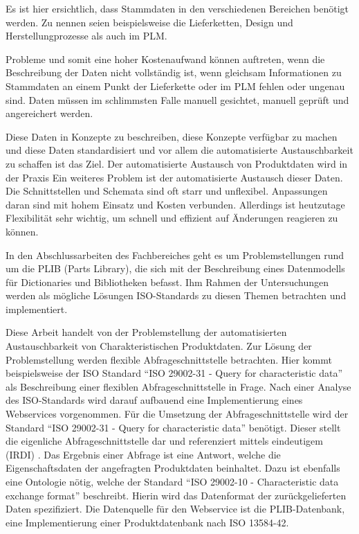 Es ist hier ersichtlich, dass Stammdaten in den verschiedenen Bereichen benötigt werden. Zu nennen seien beispielsweise die Lieferketten, Design und Herstellungprozesse als auch im \gls{PLM}.     

Probleme und somit eine hoher Kostenaufwand können auftreten, wenn die Beschreibung der Daten nicht vollständig ist, wenn gleichsam Informationen zu Stammdaten an einem Punkt der Lieferkette oder im \gls{PLM} fehlen oder ungenau sind. Daten müssen im schlimmsten Falle manuell gesichtet, manuell geprüft und angereichert werden.  

Diese Daten in Konzepte zu beschreiben, diese Konzepte verfügbar zu machen und diese Daten standardisiert und vor allem die automatisierte Austauschbarkeit zu schaffen ist das Ziel. Der automatisierte Austausch von Produktdaten wird in der Praxis Ein weiteres Problem ist der automatisierte Austausch dieser Daten. Die Schnittstellen und Schemata sind oft starr und unflexibel. Anpassungen daran sind mit hohem Einsatz und Kosten verbunden. Allerdings ist heutzutage Flexibilität sehr wichtig, um schnell und effizient auf Änderungen reagieren zu können. 

In den Abschlussarbeiten des Fachbereiches geht es um Problemstellungen rund um die \gls{PLIB} (Parts Library), die sich mit der Beschreibung eines Datenmodells für Dictionaries und Bibliotheken befasst. Ihm Rahmen der Untersuchungen werden als mögliche Lösungen ISO-Standards zu diesen Themen betrachten und implementiert. 

Diese Arbeit handelt von der Problemstellung der automatisierten Austauschbarkeit von Charakteristischen Produktdaten. Zur Lösung der Problemstellung werden flexible \gls{Abfrageschnittstelle} betrachten. Hier kommt beispielsweise der ISO Standard \enquote{ISO 29002-31 - Query for characteristic data} als Beschreibung einer flexiblen \gls{Abfrageschnittstelle} in Frage. Nach einer Analyse des ISO-Standards wird darauf aufbauend eine Implementierung eines \glspl{Webservice} vorgenommen. 
Für die Umsetzung der \gls{Abfrageschnittstelle} wird der Standard \enquote{ISO 29002-31 - Query for characteristic data} benötigt. Dieser stellt die eigenliche \gls{Abfrageschnittstelle} dar und referenziert mittels eindeutigem  (IRDI) . Das Ergebnis einer Abfrage ist eine Antwort, welche die Eigenschaftsdaten der angefragten Produktdaten beinhaltet. Dazu ist ebenfalls eine Ontologie nötig, welche der Standard \enquote{ISO 29002-10 - Characteristic data exchange format} beschreibt. Hierin wird das Datenformat der zurückgelieferten Daten spezifiziert. Die Datenquelle für den Webservice ist die PLIB-Datenbank, eine Implementierung einer Produktdatenbank nach ISO 13584-42. 

